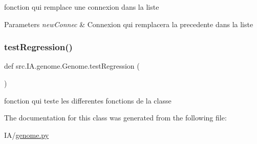fonction qui remplace une connexion dans la liste 


\begin{DoxyParams}{Parameters}
{\em new\+Connec} & Connexion qui remplacera la precedente dans la liste \\
\hline
\end{DoxyParams}
\mbox{\label{classsrc_1_1_i_a_1_1genome_1_1_genome_aba41837f605eb830e5d6afb8b120d1de}} 
\subsubsection{\texorpdfstring{test\+Regression()}{testRegression()}}
{\footnotesize\ttfamily def src.\+I\+A.\+genome.\+Genome.\+test\+Regression (\begin{DoxyParamCaption}{ }\end{DoxyParamCaption})\hspace{0.3cm}{\ttfamily [static]}}



fonction qui teste les differentes fonctions de la classe 



The documentation for this class was generated from the following file\+:\begin{DoxyCompactItemize}
\item 
I\+A/\hyperlink{_i_a_2genome_8py}{genome.\+py}\end{DoxyCompactItemize}
